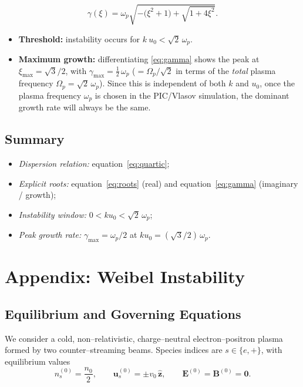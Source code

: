 \begin{equation}
    \gamma(\xi)
    = \omega_p \sqrt{-\bigl(\xi^{2} + 1\bigr) + \sqrt{1 + 4\xi^{2}} } .
    \label{eq:gamma}
\end{equation}

\begin{itemize}
    \item \textbf{Threshold:} instability occurs for $k~ u_0 < \sqrt{2}\,\omega_p$.
    \item \textbf{Maximum growth:} differentiating \ref{eq:gamma} shows the peak at $\xi_{\max} = \sqrt{3}/2$, with
    $\gamma_{\max} = \tfrac12\,\omega_p$ ($= \Omega_p/\sqrt{2}$ in terms of the \emph{total} plasma frequency $\Omega_p = \sqrt{2}\,\omega_p$). Since this is independent of both $k$ and $u_0$, once the plasma frequency $\omega_p$ is chosen in the PIC/Vlasov simulation, the dominant growth rate will always be the same.
\end{itemize}

\subsection{Summary}

\begin{itemize}
    \item \emph{Dispersion relation:} equation~\ref{eq:quartic};
    \item \emph{Explicit roots:} equation~\ref{eq:roots} (real) and equation~\ref{eq:gamma} (imaginary / growth);
    \item \emph{Instability window:} $0 < k u_0 < \sqrt{2}\,\omega_p$;
    \item \emph{Peak growth rate:} $\gamma_{\max} = \omega_p/2$ at $k u_0 = (\sqrt{3}/2)\,\omega_p$.
\end{itemize}



\section*{Appendix: Weibel Instability}\label{app:B}

\subsection{Equilibrium and Governing Equations}

We consider a cold, non--relativistic, charge--neutral electron--positron plasma formed by two counter--streaming beams.
Species indices are $s\in\{e,+\}$, with equilibrium values
\[
n_s^{(0)}=\frac{n_0}{2}, \qquad 
\bm u_s^{(0)}=\pm v_0\,\hat{\bm z}, \qquad
\bm E^{(0)}=\bm B^{(0)}=\bm 0 .
\]

